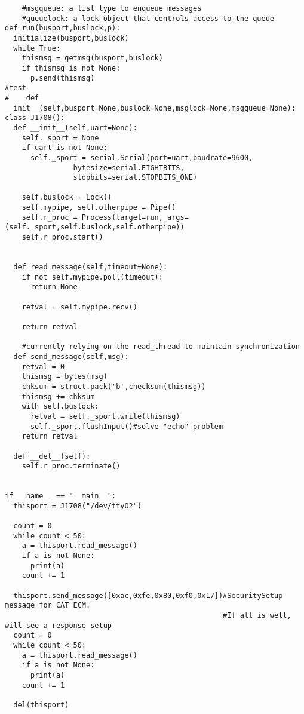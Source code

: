 \begin{verbatim}
    #msgqueue: a list type to enqueue messages
    #queuelock: a lock object that controls access to the queue
def run(busport,buslock,p):
  initialize(busport,buslock)
  while True:
    thismsg = getmsg(busport,buslock)
    if thismsg is not None:
      p.send(thismsg)
#test
#    def __init__(self,busport=None,buslock=None,msglock=None,msgqueue=None):
class J1708():
  def __init__(self,uart=None):
    self._sport = None
    if uart is not None:
      self._sport = serial.Serial(port=uart,baudrate=9600,
                bytesize=serial.EIGHTBITS,
                stopbits=serial.STOPBITS_ONE)

    self.buslock = Lock()
    self.mypipe, self.otherpipe = Pipe()
    self.r_proc = Process(target=run, args=(self._sport,self.buslock,self.otherpipe))
    self.r_proc.start()


  def read_message(self,timeout=None):
    if not self.mypipe.poll(timeout):
      return None

    retval = self.mypipe.recv()

    return retval

    #currently relying on the read_thread to maintain synchronization
  def send_message(self,msg):
    retval = 0
    thismsg = bytes(msg)
    chksum = struct.pack('b',checksum(thismsg))
    thismsg += chksum
    with self.buslock:
      retval = self._sport.write(thismsg)
      self._sport.flushInput()#solve "echo" problem
    return retval
     
  def __del__(self):
    self.r_proc.terminate()


if __name__ == "__main__":
  thisport = J1708("/dev/ttyO2")
  
  count = 0
  while count < 50:
    a = thisport.read_message()
    if a is not None:
      print(a)
    count += 1

  thisport.send_message([0xac,0xfe,0x80,0xf0,0x17])#SecuritySetup message for CAT ECM.
                                                   #If all is well, will see a response setup
  count = 0
  while count < 50:
    a = thisport.read_message()
    if a is not None:
      print(a)
    count += 1

  del(thisport)
\end{verbatim}

\label{app:schematic}



